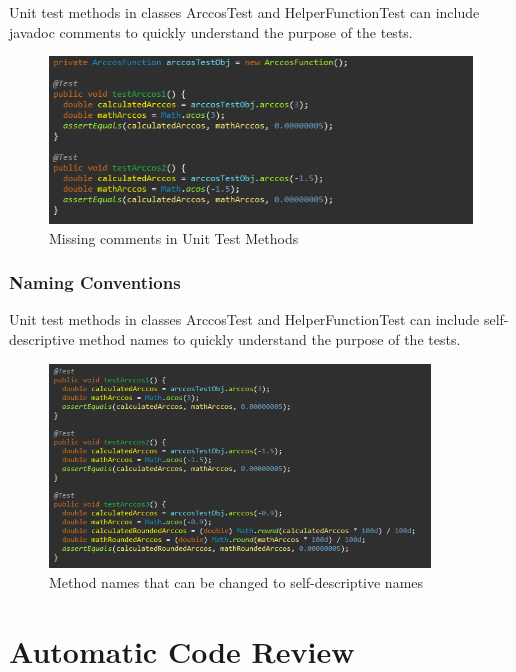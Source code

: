 \documentclass[11pt, english]{report}
\begin{document}
Unit test methods in classes ArccosTest and HelperFunctionTest can include javadoc comments to quickly understand the purpose of the tests.

\begin{figure}[H]
  
  \includegraphics[width=1\textwidth]{codereview/javadoccommentmissing.PNG}
  \centering
  \caption{ Missing comments in Unit Test Methods
}
\end{figure}

\subsubsection{Naming Conventions}

Unit test methods in classes ArccosTest and HelperFunctionTest can include self-descriptive method names to quickly understand the purpose of the tests.

\begin{figure}[H]
  
  \includegraphics[width=0.9\textwidth]{codereview/testcasemethodnames.PNG}
  \centering
  \caption{ Method names that can be changed to self-descriptive names
}
\end{figure}

\section{Automatic Code Review}
\end{document}
